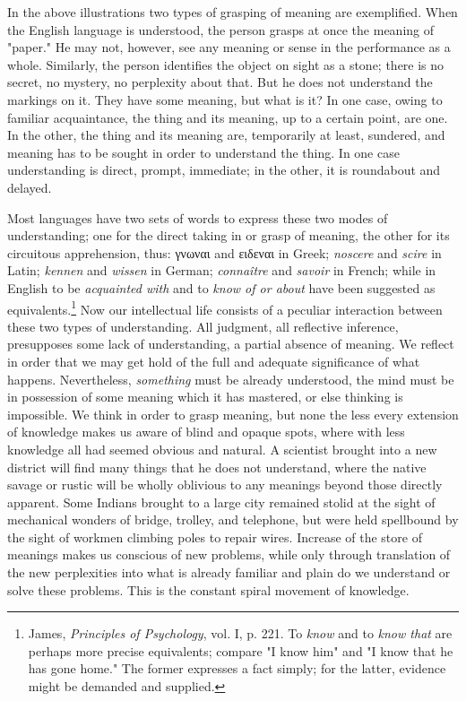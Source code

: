 \documentclass[letterpaper]{book}
\begin{document}


In the above illustrations two types of grasping of meaning are
exemplified. When the English language is understood, the person grasps
at once the meaning of "paper." He may not, however, see any meaning or
sense in the performance as a whole. Similarly, the person identifies
the object on sight as a stone; there is no secret, no mystery, no
perplexity about that. But he does not understand the markings on it.
They
have
some meaning, but what is it? In one case, owing to familiar
acquaintance, the thing and its meaning, up to a certain point, are one.
In the other, the thing and its meaning are, temporarily at least,
sundered, and meaning has to be sought in order to understand the thing.
In one case understanding is direct, prompt, immediate; in the other, it
is roundabout and delayed.


Most languages have two sets of words to express these two modes of
understanding; one for the direct taking in or grasp of meaning, the
other for its circuitous apprehension, thus: \textgreek{γνωναι} and
\textgreek{ειδεναι} in Greek; \emph{noscere} and \emph{scire} in Latin;
\emph{kennen} and \emph{wissen} in German; \emph{connaître} and
\emph{savoir} in French; while in English to be \emph{acquainted with}
and to \emph{know of or about} have been suggested as
equivalents.\footnote{
James, \emph{Principles of Psychology}, vol. I, p. 221. To \emph{know}
and to \emph{know that} are perhaps more precise equivalents; compare "I
know him" and "I know that he has gone home." The former expresses a
fact simply; for the latter, evidence might be demanded and supplied.
}
Now our intellectual life consists of a peculiar interaction between
these two types of understanding. All judgment, all reflective
inference, presupposes some lack of understanding, a partial absence of
meaning. We reflect in order that we may get hold of the full and
adequate significance of what happens. Nevertheless, \emph{something}
must be already understood, the mind must be in possession of some
meaning which it has mastered, or else thinking is impossible. We think
in order to grasp meaning, but none the less every extension of
knowledge makes us aware of blind and opaque spots, where with less
knowledge all had seemed obvious and natural. A scientist brought into a
new district will find many things that he does not understand, where
the native savage
or
rustic will be wholly oblivious to any meanings beyond those directly
apparent. Some Indians brought to a large city remained stolid at the
sight of mechanical wonders of bridge, trolley, and telephone, but were
held spellbound by the sight of workmen climbing poles to repair wires.
Increase of the store of meanings makes us conscious of new problems,
while only through translation of the new perplexities into what is
already familiar and plain do we understand or solve these problems.
This is the constant spiral movement of knowledge.
\end{document}
